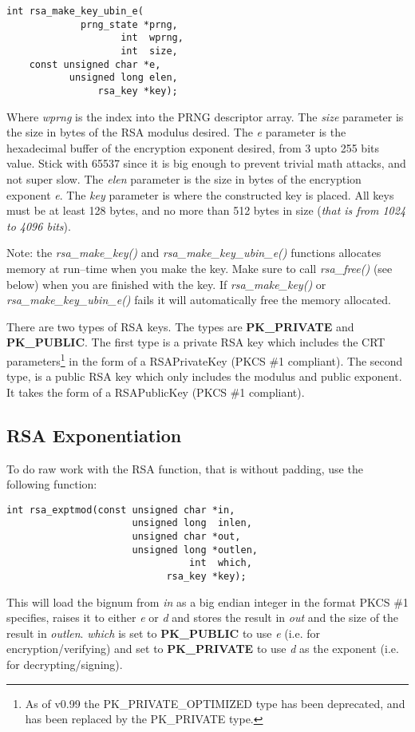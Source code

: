\documentclass[synpaper]{book}
\begin{document}
\begin{verbatim}
int rsa_make_key_ubin_e(
             prng_state *prng,
                    int  wprng,
                    int  size,
    const unsigned char *e,
           unsigned long elen,
                rsa_key *key);
\end{verbatim}

Where \textit{wprng} is the index into the PRNG descriptor array.  The \textit{size} parameter is the size in bytes of the RSA modulus desired.
The \textit{e} parameter is the hexadecimal buffer of the encryption exponent desired, from 3 upto 255 bits value.  Stick with 65537 since it is big enough
to prevent trivial math attacks, and not super slow.  The \textit{elen} parameter is the size in bytes of the encryption exponent \textit{e}.
The \textit{key} parameter is where the constructed key is placed.  All keys must be at
least 128 bytes, and no more than 512 bytes in size (\textit{that is from 1024 to 4096 bits}).

Note: the \textit{rsa\_make\_key()} and \textit{rsa\_make\_key\_ubin\_e()} functions allocates memory at run--time when you make the key.
Make sure to call \textit{rsa\_free()} (see below) when you are finished with the key.  If \textit{rsa\_make\_key()} or \textit{rsa\_make\_key\_ubin\_e()} 
fails it will automatically free the memory allocated.

 
There are two types of RSA keys.  The types are {\bf PK\_PRIVATE} and {\bf PK\_PUBLIC}.  The first type is a private
RSA key which includes the CRT parameters\footnote{As of v0.99 the PK\_PRIVATE\_OPTIMIZED type has been deprecated, and has been replaced by the
PK\_PRIVATE type.} in the form of a RSAPrivateKey (PKCS \#1 compliant).  The second type, is a public RSA key which only includes the modulus and public exponent.
It takes the form of a RSAPublicKey (PKCS \#1 compliant).

\subsection{RSA Exponentiation}
To do raw work with the RSA function, that is without padding, use the following function:
\begin{verbatim}
int rsa_exptmod(const unsigned char *in,
                      unsigned long  inlen,
                      unsigned char *out,
                      unsigned long *outlen,
                                int  which,
                            rsa_key *key);
\end{verbatim}
This will load the bignum from \textit{in} as a big endian integer in the format PKCS \#1 specifies, raises it to either \textit{e} or \textit{d} and stores the result
in \textit{out} and the size of the result in \textit{outlen}. \textit{which} is set to {\bf PK\_PUBLIC} to use \textit{e}
(i.e. for encryption/verifying) and set to {\bf PK\_PRIVATE} to use \textit{d} as the exponent (i.e. for decrypting/signing).
\end{document}
